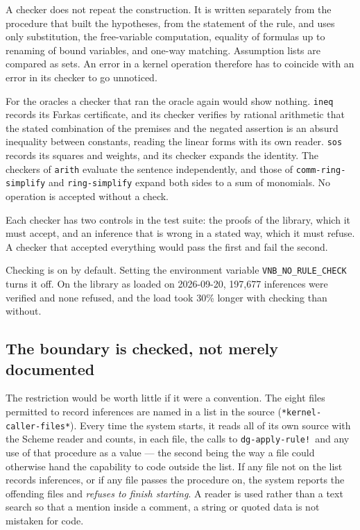 A checker does not repeat the construction.  It is written separately
from the procedure that built the hypotheses, from the statement of the
rule, and uses only substitution, the free-variable computation,
equality of formulas up to renaming of bound variables, and one-way
matching.  Assumption lists are compared as sets.  An error in a kernel
operation therefore has to coincide with an error in its checker to go
unnoticed.

For the oracles a checker that ran the oracle again would show nothing.
\texttt{ineq} records its Farkas certificate, and its checker verifies by
rational arithmetic that the stated combination of the premises and the
negated assertion is an absurd inequality between constants, reading the
linear forms with its own reader.  \texttt{sos} records its squares and
weights, and its checker expands the identity.  The checkers of
\texttt{arith} evaluate the sentence independently, and those of
\texttt{comm-ring-simplify} and \texttt{ring-simplify} expand both sides
to a sum of monomials.  No operation is accepted without a check.

Each checker has two controls in the test suite: the proofs of the
library, which it must accept, and an inference that is wrong in a
stated way, which it must refuse.  A checker that accepted everything
would pass the first and fail the second.

\begin{remark}
Checking is on by default.  Setting the environment variable
\texttt{VNB\_NO\_RULE\_CHECK} turns it off.  On the library as loaded on
2026-09-20, 197{,}677 inferences were verified and none refused, and the
load took 30\% longer with checking than without.
\end{remark}

\subsection{The boundary is checked, not merely documented}\label{sec:kernel-checked}

The restriction would be worth little if it were a convention.  The eight
files permitted to record inferences are named in a list in the source
(\texttt{*kernel-caller-files*}).  Every time the system starts, it reads
all of its own source with the Scheme reader and counts, in each file,
the calls to \texttt{dg-apply-rule!}\ and any use of that procedure as a
value --- the second being the way a file could otherwise hand the
capability to code outside the list.  If any file not on the list records
inferences, or if any file passes the procedure on, the system reports
the offending files and \emph{refuses to finish starting}.  A reader is
used rather than a text search so that a mention inside a comment, a
string or quoted data is not mistaken for code.

